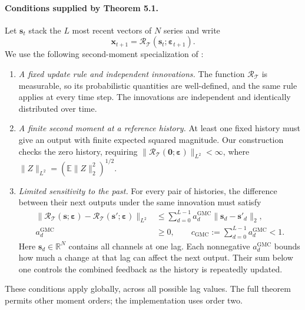 \paragraph{Conditions supplied by Theorem 5.1.}
Let $\mathbf{s}_t$ stack the $L$ most recent vectors of $N$ series and write
\begin{equation}
 \mathbf x_{t+1}=\mathcal R_{\mathcal T}(\mathbf{s}_t;
                                      \boldsymbol\varepsilon_{t+1}).
 \label{eq:implemented-gmc-recurrence}
\end{equation}
We use the following second-moment specialization of
\citet[Section~5, Theorem~5.1 and its proof, electronic reprint
pp.~11--12]{shao2007spectral}:
\begin{enumerate}
\item \emph{A fixed update rule and independent innovations.}
The function $\mathcal R_{\mathcal T}$ is measurable, so its probabilistic
quantities are well-defined, and the same rule applies at every time step.
The innovations are independent and identically distributed over time.
\item \emph{A finite second moment at a reference history.}
At least one fixed history must give an output with finite expected squared
magnitude. Our construction checks the zero history, requiring
$\|\mathcal R_{\mathcal T}(\mathbf 0;\boldsymbol\varepsilon)\|_{L^2}<\infty$,
where $\|Z\|_{L^2}=(\mathbb E\|Z\|_2^2)^{1/2}$.
\item \emph{Limited sensitivity to the past.}
For every pair of histories, the difference between their next outputs under
the same innovation must satisfy
\begin{equation}
\begin{split}
 \|\mathcal R_{\mathcal T}(\mathbf{s};\boldsymbol\varepsilon)
      -\mathcal R_{\mathcal T}(\mathbf{s}';\boldsymbol\varepsilon)\|_{L^2}
 &\leq\sum_{d=0}^{L-1}a_d^{\mathrm{GMC}}
                   \|\mathbf{s}_d-\mathbf{s}'_d\|_2,\\
 a_d^{\mathrm{GMC}}&\geq0,\qquad
 c_{\mathrm{GMC}}:=\sum_{d=0}^{L-1}a_d^{\mathrm{GMC}}<1.
\end{split}
\label{eq:implemented-gmc-condition}
\end{equation}
Here $\mathbf{s}_d\in\mathbb R^N$ contains all channels at one lag.
Each nonnegative $a_d^{\mathrm{GMC}}$ bounds how much a change at that lag
can affect the next output. Their sum below one controls the combined feedback
as the history is repeatedly updated.
\end{enumerate}
These conditions apply globally, across all possible lag values. The full
theorem permits other moment orders; the implementation uses order two.

